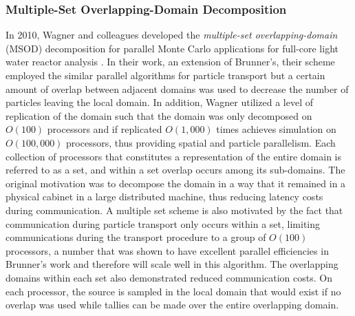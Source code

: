 \subsubsection{Multiple-Set Overlapping-Domain Decomposition}
\label{subsubsec:msod}
In 2010, Wagner and colleagues developed the \textit{multiple-set
  overlapping-domain} (MSOD) decomposition for parallel Monte Carlo
applications for full-core light water reactor analysis
\citep{wagner_hybrid_2010}. In their work, an extension of Brunner's,
their scheme employed the similar parallel algorithms for particle
transport but a certain amount of overlap between adjacent domains was
used to decrease the number of particles leaving the local domain. In
addition, Wagner utilized a level of replication of the domain such
that the domain was only decomposed on $O(100)$ processors and if
replicated $O(1,000)$ times achieves simulation on $O(100,000)$
processors, thus providing spatial and particle parallelism. Each
collection of processors that constitutes a representation of the
entire domain is referred to as a set, and within a set overlap occurs
among its sub-domains. The original motivation was to decompose the
domain in a way that it remained in a physical cabinet in a large
distributed machine, thus reducing latency costs during
communication. A multiple set scheme is also motivated by the fact
that communication during particle transport only occurs within a set,
limiting communications during the transport procedure to a group of
$O(100)$ processors, a number that was shown to have excellent
parallel efficiencies in Brunner's work and therefore will scale well
in this algorithm. The overlapping domains within each set also
demonstrated reduced communication costs. On each processor, the
source is sampled in the local domain that would exist if no overlap
was used while tallies can be made over the entire overlapping domain.

